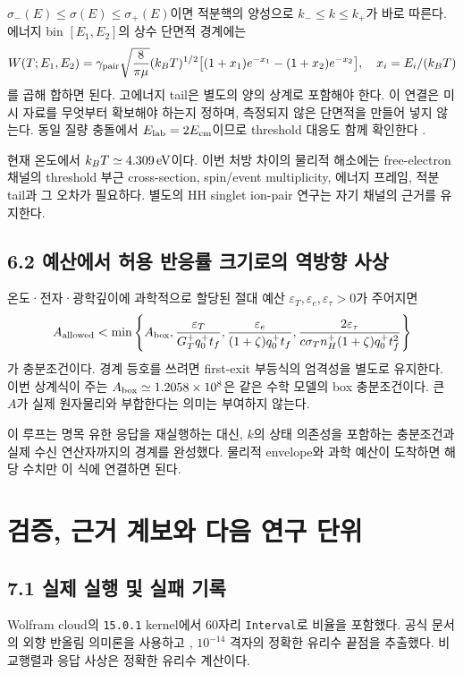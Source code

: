 \documentclass[11pt,a4paper]{article}
\begin{document}
$\sigma_-(E)\le\sigma(E)\le\sigma_+(E)$이면 적분핵의 양성으로 $k_-\le k\le k_+$가 바로 따른다. 에너지 bin $[E_1,E_2]$의 상수 단면적 경계에는
\begin{align}
 W(T;E_1,E_2)=\gamma_{\rm pair}\sqrt{\frac8{\pi\mu}}(k_BT)^{1/2}
 \big[(1+x_1)e^{-x_1}-(1+x_2)e^{-x_2}\big],\quad x_i=E_i/(k_BT)
\end{align}
를 곱해 합하면 된다. 고에너지 tail은 별도의 양의 상계로 포함해야 한다. 이 연결은 미시 자료를 무엇부터 확보해야 하는지 정하며, 측정되지 않은 단면적을 만들어 넣지 않는다. 동일 질량 충돌에서 $E_{\rm lab}=2E_{\rm cm}$이므로 threshold 대응도 함께 확인한다 \cite{barklem}.

현재 온도에서 $k_BT\simeq4.309\,\mathrm{eV}$이다. 이번 처방 차이의 물리적 해소에는 free-electron 채널의 threshold 부근 cross-section, spin/event multiplicity, 에너지 프레임, 적분 tail과 그 오차가 필요하다. 별도의 HH singlet ion-pair 연구는 자기 채널의 근거를 유지한다.

\subsection*{6.2 예산에서 허용 반응률 크기로의 역방향 사상}
온도·전자·광학깊이에 과학적으로 할당된 절대 예산 $\varepsilon_T,\varepsilon_e,\varepsilon_\tau>0$가 주어지면
\begin{align}
 A_{\rm allowed}<\min\left\{
 A_{\rm box},\frac{\varepsilon_T}{G_T^+q_0^+t_f},
 \frac{\varepsilon_e}{(1+\zeta)q_0^+t_f},
 \frac{2\varepsilon_\tau}{c\sigma_Tn_H^+(1+\zeta)q_0^+t_f^2}
 \right\}
\end{align}
가 충분조건이다. 경계 등호를 쓰려면 first-exit 부등식의 엄격성을 별도로 유지한다. 이번 상계식이 주는 $A_{\rm box}\simeq1.2058\times10^8$은 같은 수학 모델의 box 충분조건이다. 큰 $A$가 실제 원자물리와 부합한다는 의미는 부여하지 않는다.

이 루프는 명목 유한 응답을 재실행하는 대신, $k$의 상태 의존성을 포함하는 충분조건과 실제 수신 연산자까지의 경계를 완성했다. 물리적 envelope와 과학 예산이 도착하면 해당 수치만 이 식에 연결하면 된다.

\newpage
\section{검증, 근거 계보와 다음 연구 단위}
\subsection*{7.1 실제 실행 및 실패 기록}
Wolfram cloud의 \texttt{15.0.1} kernel에서 60자리 \texttt{Interval}로 비율을 포함했다. 공식 문서의 외향 반올림 의미론을 사용하고 \cite{wolfram}, $10^{-14}$ 격자의 정확한 유리수 끝점을 추출했다. 비교행렬과 응답 사상은 정확한 유리수 계산이다.
\end{document}
